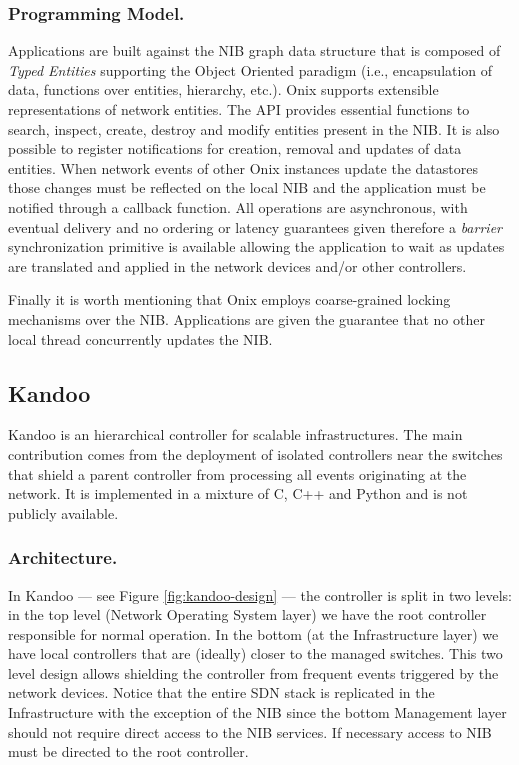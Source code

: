\subsubsection{Programming Model.} Applications are built against the NIB graph data structure that is
composed of \emph{Typed Entities} supporting the Object
Oriented paradigm (i.e., encapsulation of data, functions over
entities, hierarchy, etc.). Onix supports extensible representations of
network entities. The
API provides essential functions to search, inspect, create, destroy and
modify entities present in the NIB. It is also possible to register
notifications for creation, removal and updates of data
entities. When network events of other Onix instances update the
datastores those changes must be reflected on the local NIB and the
application must be notified through a callback function. 
All operations are asynchronous, with
eventual delivery and no ordering or latency guarantees given
therefore a \emph{barrier} synchronization primitive is available
allowing the application to wait as
updates are translated and applied in the network devices and/or other
controllers. 

Finally it is worth mentioning that Onix employs coarse-grained
locking mechanisms over the NIB. Applications are given the guarantee
that no other local thread concurrently updates the NIB. 

\subsection{Kandoo}
Kandoo \cite{Yeganeh:2012jm} is an hierarchical controller for
scalable infrastructures. The main
contribution comes from the deployment of isolated controllers near
the switches that shield a parent  controller from processing all
events originating at the network. It is implemented in a mixture of
C, C++ and Python and is not publicly available. 

\subsubsection{Architecture.} In Kandoo --- see Figure  \ref{fig:kandoo-design} --- the controller is split in two levels: in the top level (Network Operating System layer) we
have the root controller responsible for normal operation. In the
bottom (at the Infrastructure layer) we have local controllers that are (ideally)  closer to the
managed switches. This two level design allows  shielding the
controller from frequent events triggered by 
the network devices. Notice that  the entire SDN
stack is replicated in the Infrastructure with the exception of the
NIB since the bottom Management layer should not require direct access to the NIB services. If necessary access to NIB
must be directed to the root controller.

